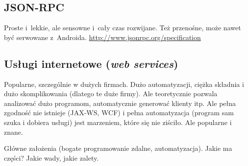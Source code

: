 \subsection{JSON-RPC}
Proste i~lekkie, ale sensowne i~cały czas rozwijane. Też przenośne, może nawet być serwowane z~Androida.
\url{http://www.jsonrpc.org/specification}

\subsection{Usługi internetowe (\emph{web services})}
Popularne, szczególnie w dużych firmach. Dużo automatyzacji, ciężka składnia i dużo skomplikowania (dlatego te duże firmy).
Ale teoretycznie pozwala analizować dużo programom, automatycznie generować klienty itp. Ale pełna zgodność nie istnieje (JAX-WS, WCF) i pełna automatyzacja (program sam szuka i dobiera usługi) jest marzeniem, które się nie ziściło. Ale popularne i znane.

Główne założenia (bogate programowanie zdalne, automatyzacja). Jakie ma części? Jakie wady, jakie zalety.

